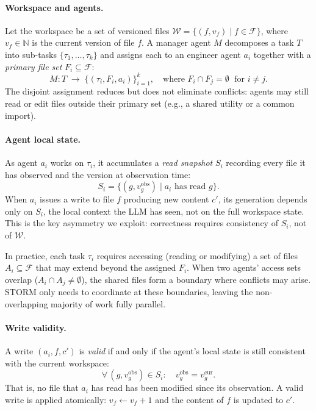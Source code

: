 \documentclass{article}
\begin{document}
\paragraph{Workspace and agents.} Let the workspace be a set of versioned files $\mathcal{W} = \{(f, v_f) \mid f \in \mathcal{F}\}$, where $v_f \in \mathbb{N}$ is the current version of file $f$. A manager agent $M$ decomposes a task $T$ into sub-tasks $\{\tau_1, \ldots, \tau_k\}$ and assigns each to an engineer agent $a_i$ together with a \emph{primary file set} $F_i \subseteq \mathcal{F}$:
\begin{equation}
  M: T \;\longrightarrow\; \{(\tau_i, F_i, a_i)\}_{i=1}^{k}, \quad \text{where } F_i \cap F_j = \emptyset \;\text{ for } i \neq j.
\end{equation}
The disjoint assignment reduces but does not eliminate conflicts: agents may still read or edit files outside their primary set (e.g., a shared utility or a common import).

\paragraph{Agent local state.} As agent $a_i$ works on $\tau_i$, it accumulates a \emph{read snapshot} $S_i$ recording every file it has observed and the version at observation time:
\begin{equation}
  S_i = \{(g, v_g^{\text{obs}}) \mid a_i \text{ has read } g\}.
\end{equation}
When $a_i$ issues a write to file $f$ producing new content $c'$, its generation depends only on $S_i$, the local context the LLM has seen, not on the full workspace state. This is the key asymmetry we exploit: correctness requires consistency of $S_i$, not of $\mathcal{W}$.

In practice, each task $\tau_i$ requires accessing (reading or modifying) a set of files $A_i \subseteq \mathcal{F}$ that may extend beyond the assigned $F_i$. When two agents' access sets overlap ($A_i \cap A_j \neq \emptyset$), the shared files form a boundary where conflicts may arise. STORM only needs to coordinate at these boundaries, leaving the non-overlapping majority of work fully parallel.

\paragraph{Write validity.} A write $(a_i, f, c')$ is \emph{valid} if and only if the agent's local state is still consistent with the current workspace:
\begin{equation}
\label{eq:validity}
  \forall\, (g, v_g^{\text{obs}}) \in S_i: \quad v_g^{\text{obs}} = v_g^{\text{cur}}.
\end{equation}
That is, no file that $a_i$ has read has been modified since its observation. A valid write is applied atomically: $v_f \leftarrow v_f + 1$ and the content of $f$ is updated to $c'$.
\end{document}
